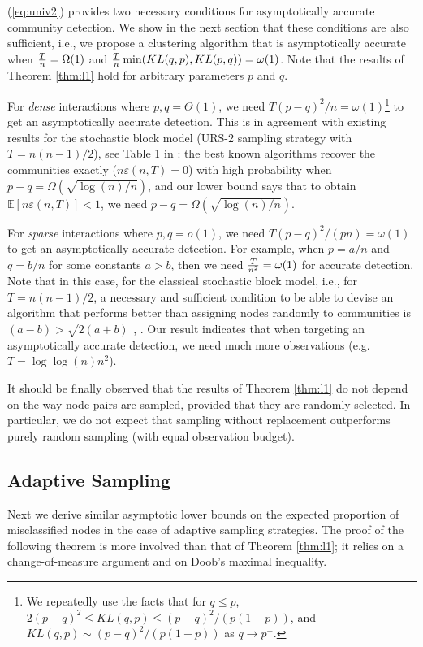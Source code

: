 \documentclass[12pt]{colt}%
\begin{document}
(\ref{eq:univ2}) provides two necessary conditions for asymptotically accurate community detection. We show in the next section that these conditions are also sufficient, i.e., we propose a clustering algorithm that is asymptotically accurate when ${T\over n}=\Omega(1)$ and ${T\over n}\min(KL(q,p),KL(p,q))=\omega(1)$. Note that the results of Theorem \ref{thm:l1} hold for arbitrary parameters $p$ and $q$. 

For {\it dense} interactions where $p,q=\Theta(1)$, we need $T(p-q)^2/n=\omega(1)$\footnote{We repeatedly use the facts that for $q\le p$, $2(p-q)^2\le KL(q,p)\le (p-q)^2/(p(1-p))$, and $KL(q,p)\sim (p-q)^2/(p(1-p))$ as $q\to p^-$.} to get an asymptotically accurate detection. This is in agreement with existing results for the stochastic block model (URS-2 sampling strategy with $T=n(n-1)/2$), see Table 1 in \cite{chen2012}: the best known algorithms recover the communities exactly ($n\varepsilon(n,T) = 0$) with high probability when $p-q=\Omega(\sqrt{\log(n)/n})$, and our lower bound says that to obtain $\mathbb{E}[n \varepsilon (n,T)] < 1$, we need $p-q=\Omega(\sqrt{\log(n)/n})$. 

For {\it sparse} interactions where $p,q=o(1)$, we need $T(p-q)^2/(pn)=\omega(1)$ to get an asymptotically accurate detection. For example, when $p=a/n$ and $q=b/n$ for some constants $a>b$, then we need ${T\over n^2}=\omega(1)$ for accurate detection. Note that in this case, for the classical stochastic block model, i.e., for $T=n(n-1)/2$, a necessary and sufficient condition to be able to devise an algorithm that performs better than assigning nodes randomly to communities is $(a-b)>\sqrt{2(a+b)}$ \cite{mossel2012stochastic}, \cite{massoulie2013}. Our result indicates that when targeting an asymptotically accurate detection, we need much more observations (e.g. $T=\log\log(n)n^2$).


It should be finally observed that the results of Theorem \ref{thm:l1} do not depend on the way node pairs are sampled, provided that they are randomly selected. In particular, we do not expect that sampling without replacement outperforms purely random sampling (with equal observation budget). 

\subsection{Adaptive Sampling}

Next we derive similar asymptotic lower bounds on the expected proportion of misclassified nodes in the case of adaptive sampling strategies. The proof of the following theorem is more involved than that of Theorem \ref{thm:l1}; it relies on a change-of-measure argument and on Doob's maximal inequality. 
\end{document}

